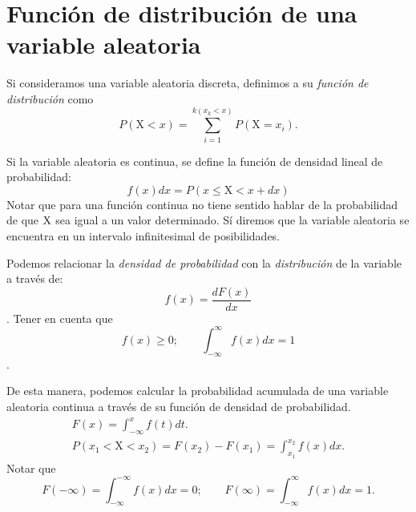 \documentclass[openany]{book}
\begin{document}
\section{Función de distribución de una variable aleatoria}
Si consideramos una variable aleatoria discreta, definimos a su \emph{función de distribución} como 
\begin{equation}
	\label{eq:func-distr-discreta}
	P(\mathrm{X}<x)=\sum_{i=1}^{k(x_k<x)}P(\mathrm{X}=x_i)
.\end{equation}
\par Si la variable aleatoria es continua, se define la función de densidad lineal de probabilidad:
\begin{equation}
  f(x)dx=P(x\leq\mathrm{X}<x+dx)
  \label{eq:densidad-de-prob}
\end{equation}
Notar que para una función continua no tiene sentido hablar de la probabilidad de que $\rm{X}$ sea igual a un valor determinado. Sí diremos que la variable aleatoria se encuentra en un intervalo infinitesimal de posibilidades.
\par Podemos relacionar la \emph{densidad de probabilidad} con la \emph{distribución} de la variable a través de:
\begin{equation}
  \label{eq:fyF}
  f(x)=\frac{dF(x)}{dx}
\end{equation}.
Tener en cuenta que 
\begin{equation*}
  f(x)\geq0;\qquad \int_{-\infty}^{\infty}f(x)dx=1
\end{equation*}.

\par De esta manera, podemos calcular la probabilidad acumulada de una variable aleatoria continua a través de su función de densidad de probabilidad.
\begin{gather}
  \label{eq:Fx-ft}
  F(x)=\int_{-\infty}^{x}f(t)dt.\\
  P(x_1<\mathrm{X}<x_2)=F(x_2)-F(x_1)=\int_{x_1}^{x_2}f(x)dx.
\end{gather}
Notar que
\begin{equation*}
  F(-\infty)=\int_{-\infty}^{-\infty}f(x)dx=0;\qquad F(\infty)=\int_{-\infty}^{\infty}f(x)dx=1.
\end{equation*}
\end{document}
